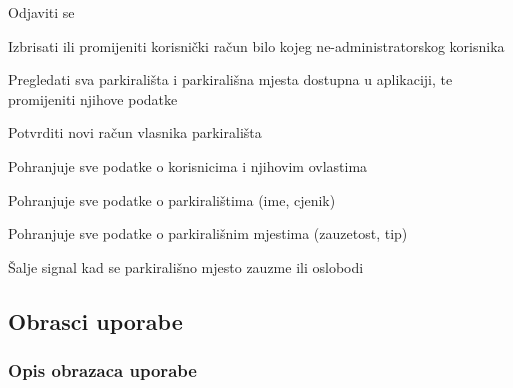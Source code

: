 \begin{packed_enum}
\begin{packed_enum}
				\end{packed_enum}
			
				\item  {}
				
				\begin{packed_enum}
					
					\item Odjaviti se
					\item Izbrisati ili promijeniti korisnički račun bilo kojeg ne-administratorskog korisnika
					\item Pregledati sva parkirališta i parkirališna mjesta dostupna u aplikaciji, te promijeniti njihove podatke
					\item Potvrditi novi račun vlasnika parkirališta
					
				\end{packed_enum}
			
				\item  {}
				
				\begin{packed_enum}
					
					\item Pohranjuje sve podatke o korisnicima i njihovim ovlastima
					\item Pohranjuje sve podatke o parkiralištima (ime, cjenik)
					\item Pohranjuje sve podatke o parkirališnim mjestima (zauzetost, tip)
					
				\end{packed_enum}
			
				\item  {}
				
				\begin{packed_enum}
					
					\item Šalje signal kad se parkirališno mjesto zauzme ili oslobodi
					
				\end{packed_enum}
			\end{packed_enum}
			
			\eject 
			
			
				
			\subsection{Obrasci uporabe}
				
				\subsubsection{Opis obrazaca uporabe}
			
